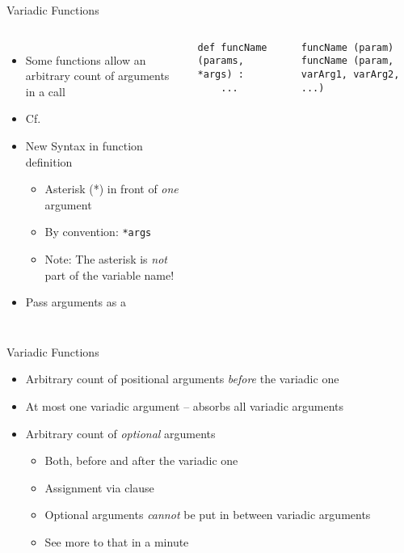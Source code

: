 \begin{frame}[fragile]{Variadic Functions}
%
\begin{columns}[T]
\begin{itemize}
\item Some functions allow an arbitrary count of arguments in a call
\item Cf. 
\item New Syntax in function definition
	\begin{itemize}
	\item Asterisk (*) in front of \emph{one} argument
	\item By convention: \texttt{*args}
	\item Note: The asterisk is \emph{not} part of the variable name!
	\end{itemize}
\item Pass arguments as a 
\end{itemize}
%
\begin{codebox}
\begin{verbatim}
def funcName (params, *args) :
    ...
\end{verbatim}
\end{codebox}
%
\begin{codebox}
\begin{verbatim}
funcName (param)
funcName (param, varArg1, varArg2, ...)
\end{verbatim}
\end{codebox}
\end{columns}
%
\end{frame}


\begin{frame}{Variadic Functions}
%
\begin{itemize}
\item Arbitrary count of positional arguments \emph{before} the variadic one
\item At most one variadic argument -- absorbs all variadic arguments
\item Arbitrary count of \emph{optional} arguments
	\begin{itemize}
	\item Both, before and after the variadic one
	\item Assignment via clause 
	\item Optional arguments \emph{cannot} be put in between variadic arguments
	\item See more to that in a minute
	\end{itemize}
\end{itemize}
%
\end{frame}

